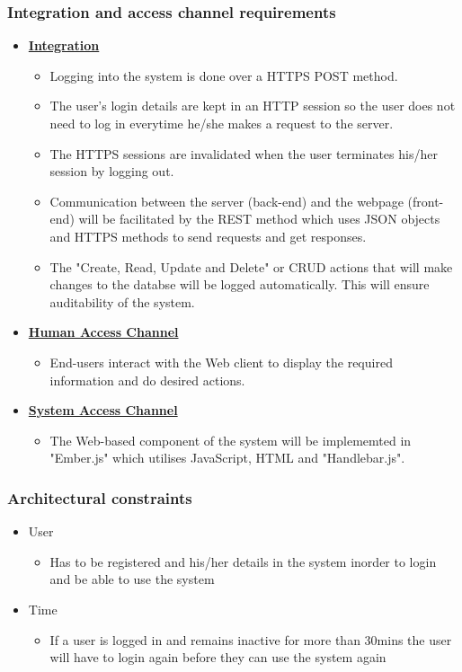 \documentclass[a4paper,12pt]{article}
\begin{document}
\subsubsection{Integration and access channel requirements}
	\begin{itemize}
		\item{\bfseries \underline{Integration}}
		\begin{itemize}
           		\item Logging into the system is done over a HTTPS POST method.
			\item The user's login details are kept in an HTTP session so the user does not need to log in everytime he/she 					makes a request to the server.
			\item The HTTPS sessions are invalidated when the user terminates his/her session by logging out.
			\item Communication between the server (back-end) and the webpage (front-end) will be facilitated by the REST 					method which uses JSON objects and HTTPS methods to send requests and get responses.
			\item The "Create, Read, Update and Delete" or CRUD actions that will make changes to the databse will be 					logged automatically. This will ensure auditability of the system. 
		\end{itemize}

		\item{\bfseries \underline{Human Access Channel}}
			\begin{itemize}
				\item End-users interact with the Web client to display the required information and do desired actions. 
			\end{itemize}

		\item{\bfseries \underline{System Access Channel}}
			\begin{itemize}
				\item The Web-based component of the system will be implememted in "Ember.js" which utilises JavaScript, HTML and "Handlebar.js".  
			\end{itemize}
	\end{itemize}
\subsubsection{Architectural constraints}
	\begin{itemize}
		\item User
			\begin{itemize}
				\item Has to be registered and his/her details in the system inorder to login and be able to use the system
			\end{itemize}
		\item Time
			\begin{itemize}
				\item If a user is logged in and remains inactive for more than 30mins the user will have to login again before they can use the system again
			\end{itemize}
	\end{itemize}	
\end{document}
